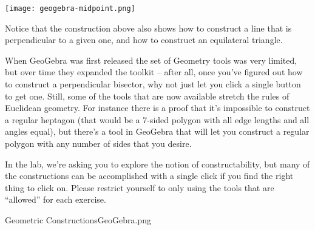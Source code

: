 \centerline{\texttt{[image: geogebra-midpoint.png]}}

Notice that the construction above also shows how to construct a line that is perpendicular to a given one, and how to construct an equilateral triangle.

When GeoGebra was first released the set of Geometry tools was very limited, but over time they expanded the toolkit -- after all, once you've figured out how to construct a perpendicular bisector, why not just let you click a single button to get one.  Still, some of the tools that are now available stretch the rules of Euclidean geometry.  For instance there is a proof that it's impossible to construct a regular heptagon (that would be a 7-sided polygon with all edge lengths and all angles equal), but there's a tool in GeoGebra that will let you construct a regular polygon with any number of sides that you desire.

In the lab, we're asking you to explore the notion of constructability, but many of the constructions can be accomplished with a single click if you find the right thing to click on.  Please restrict yourself to only using the tools that are ``allowed'' for each exercise.

 \clearpage
 \begin{worksheet}{15}{Geometric Constructions}{GeoGebra.png}
 
 \end{worksheet}
 \clearpage


